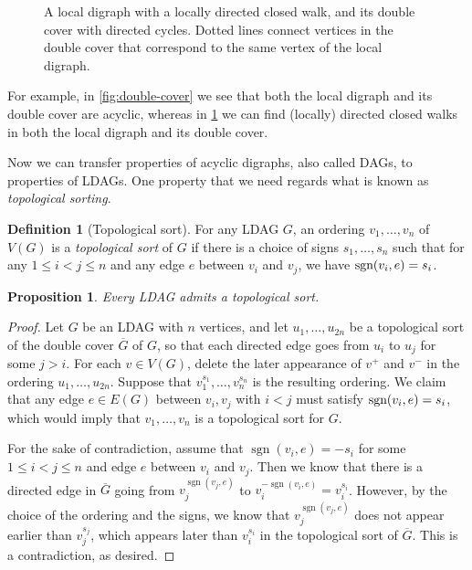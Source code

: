 \documentclass[reqno,11pt]{amsart}
\numberwithin{equation}{section}
\newtheorem{proposition}[theorem]{Proposition}
\theoremstyle{definition}
\newtheorem{definition}[theorem]{Definition}
\theoremstyle{remark}
\DeclareMathOperator{\sgn}{sgn}
\begin{document}
\begin{figure}[h]
\begin{tikzpicture}
    \end{tikzpicture}
    \caption{A local digraph with a locally directed closed walk, and its double cover with directed cycles. Dotted lines connect vertices in the double cover that correspond to the same vertex of the local digraph.}
    \label{fig:cyclic-double-cover}
\end{figure}

For example, in \cref{fig:double-cover} we see that both the local digraph and its double cover are acyclic, whereas in \cref{fig:cyclic-double-cover} we can find (locally) directed closed walks in both the local digraph and its double cover.

Now we can transfer properties of acyclic digraphs, also called DAGs, to properties of LDAGs. 
One property that we need regards what is known as \emph{topological sorting}.

\begin{definition}[Topological sort]\label{def:topological-sort}
    For any LDAG $G$, an ordering $v_1,\ldots, v_n$ of $V(G)$ is a \emph{topological sort} of $G$ if there is a choice of signs $s_1,\ldots,s_n$ such that for any $1\leq i<j\leq n$ and any edge $e$ between $v_i$ and $v_j$, we have  $\textup{sgn}(v_i,e)=s_i$.
\end{definition}

\begin{proposition}\label{prop:topological-sort}
    Every LDAG admits a topological sort.
\end{proposition}
\begin{proof}
    Let $G$ be an LDAG with $n$ vertices, and let $u_1,\ldots, u_{2n}$ be a topological sort of the double cover $\overline{G}$ of $G$, so that each directed edge goes from $u_i$ to $u_j$ for some $j>i$. 
    For each $v\in V(G)$, delete the later appearance of $v^+$ and $v^-$ in the ordering $u_1,\ldots,u_{2n}$. 
    Suppose that $v_1^{s_1},\ldots, v_n^{s_n}$ is the resulting ordering.
    We claim that any edge $e\in E(G)$ between $v_i,v_j$ with $i<j$ must satisfy $\textup{sgn}(v_i,e)=s_i$, which would imply that $v_1,\ldots, v_n$ is a topological sort for $G$.

    For the sake of contradiction, assume that $\sgn(v_i,e)=-s_i$ for some $1\leq i<j\leq n$ and edge $e$ between $v_i$ and $v_j$.
    Then we know that there is a directed edge in $\overline{G}$ going from $v_j^{\sgn(v_j,e)}$ to $v_i^{-\sgn(v_i,e)} = v_i^{s_i}$.
    However, by the choice of the ordering and the signs, we know that $v_j^{\sgn(v_j,e)}$ does not appear earlier than $v_j^{s_j}$, which appears later than $v_i^{s_i}$ in the topological sort of $\overline{G}$.
    This is a contradiction, as desired.
\end{proof}
\end{document}
